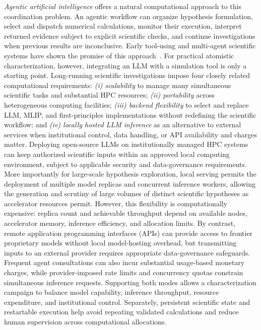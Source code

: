 \documentclass[11pt,a4paper]{article}
\begin{document}
\emph{Agentic artificial intelligence} offers a natural computational approach to this coordination problem. An agentic workflow can organize hypothesis formulation, select and dispatch numerical calculations, monitor their execution, interpret returned evidence subject to explicit scientific checks, and continue investigations when previous results are inconclusive. Early tool-using and multi-agent scientific systems have shown the promise of this approach~\cite{boiko2023coscientist,ghafarollahi2025sciagents}. For practical atomistic characterization, however, integrating an LLM with a simulation tool is only a starting point. Long-running scientific investigations impose four closely related computational requirements: \emph{(i) scalability} to manage many simultaneous scientific tasks and substantial HPC resources; \emph{(ii) portability} across heterogeneous computing facilities; \emph{(iii) backend flexibility} to select and replace LLM, MLIP, and first-principles implementations without redefining the scientific workflow; and \emph{(iv) locally hosted LLM inference} as an alternative to external services when institutional control, data handling, or API availability and charges matter. Deploying open-source LLMs on institutionally managed HPC systems can keep authorized scientific inputs within an approved local computing environment, subject to applicable security and data-governance requirements. More importantly for large-scale hypothesis exploration, local serving permits the deployment of multiple model replicas and concurrent inference workers, allowing the generation and scrutiny of large volumes of distinct scientific hypotheses as accelerator resources permit. However, this flexibility is computationally expensive: replica count and achievable throughput depend on available nodes, accelerator memory, inference efficiency, and allocation limits. By contrast, remote application programming interfaces (APIs) can provide access to frontier proprietary models without local model-hosting overhead, but transmitting inputs to an external provider requires appropriate data-governance safeguards. Frequent agent consultations can also incur substantial usage-based monetary charges, while provider-imposed rate limits and concurrency quotas constrain simultaneous inference requests. Supporting both modes allows a characterization campaign to balance model capability, inference throughput, resource expenditure, and institutional control. Separately, persistent scientific state and restartable execution help avoid repeating validated calculations and reduce human supervision across computational allocations.
\end{document}
